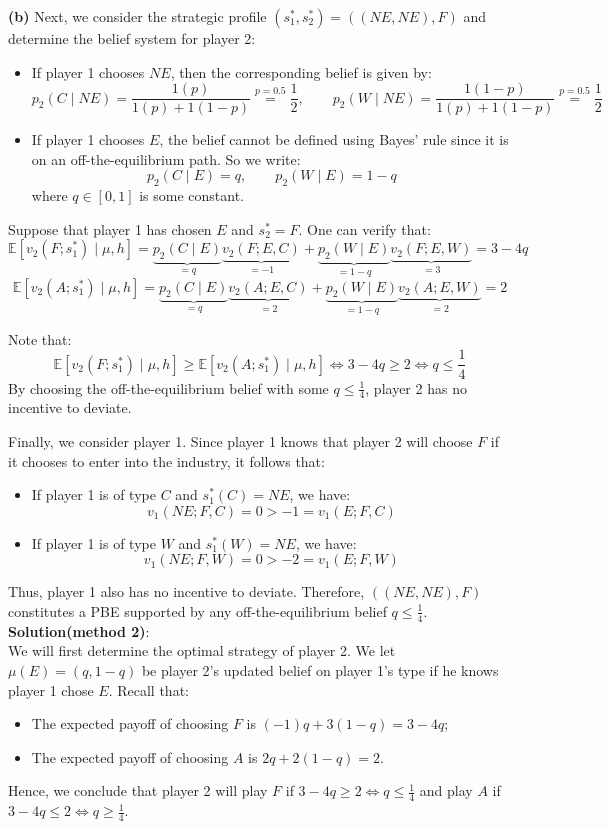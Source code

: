 \documentclass[twoside]{article}
\theoremstyle{definitionstyle}
\begin{document}
\textbf{(b)} Next, we consider the strategic profile $(s_1^*, s_2^*) = ((NE, NE), F)$ and determine the belief system for player 2:
\begin{itemize}
    \item If player 1 chooses $NE$, then the corresponding belief is given by:
    $$p_2(C \mid NE) = \frac{1(p)}{1(p) + 1(1 - p)} \overset{p=0.5}{=} \frac{1}{2}, \qquad p_2(W \mid NE) = \frac{1(1 - p)}{1(p) + 1(1 - p)} \overset{p=0.5}{=} \frac{1}{2}$$
    
    \item If player 1 chooses $E$, the belief cannot be defined using Bayes' rule since it is on an off-the-equilibrium path. So we write:
    $$p_2(C \mid E) = q, \qquad p_2(W \mid E) = 1 - q$$
    where $q \in [0,1]$ is some constant.
\end{itemize}

Suppose that player 1 has chosen $E$ and $s_2^* = F$. One can verify that:
$$\mathbb{E}[v_2(F; s_1^*) \mid \mu, h] = \underbrace{p_2(C \mid E)}_{=q} \underbrace{v_2(F; E, C)}_{=-1} + \underbrace{p_2(W \mid E)}_{=1-q} \underbrace{v_2(F; E, W)}_{=3} = 3 - 4q$$
$$\mathbb{E}[v_2(A; s_1^*) \mid \mu, h] = \underbrace{p_2(C \mid E)}_{=q} \underbrace{v_2(A; E, C)}_{=2} + \underbrace{p_2(W \mid E)}_{=1-q} \underbrace{v_2(A; E, W)}_{=2} = 2$$

Note that:
$$\mathbb{E}[v_2(F; s_1^*) \mid \mu, h] \ge \mathbb{E}[v_2(A; s_1^*) \mid \mu, h] \iff 3 - 4q \ge 2 \iff q \le \frac{1}{4}$$
By choosing the off-the-equilibrium belief with some $q \le \frac{1}{4}$, player 2 has no incentive to deviate.

Finally, we consider player 1. Since player 1 knows that player 2 will choose $F$ if it chooses to enter into the industry, it follows that:
\begin{itemize}
    \item If player 1 is of type $C$ and $s_1^*(C) = NE$, we have:
    $$v_1(NE; F, C) = 0 > -1 = v_1(E; F, C)$$
    \item If player 1 is of type $W$ and $s_1^*(W) = NE$, we have:
    $$v_1(NE; F, W) = 0 > -2 = v_1(E; F, W)$$
\end{itemize}
Thus, player 1 also has no incentive to deviate. Therefore, $((NE, NE), F)$ constitutes a PBE supported by any off-the-equilibrium belief $q \le \frac{1}{4}$.\\
\newline
\textbf{Solution(method 2)}:\\
We will first determine the optimal strategy of player 2. 
We let $\mu(E) = (q, 1 - q)$ be player 2’s updated belief on player 1’s type if he knows player 1 chose $E$. Recall that:
\begin{itemize}
    \item The expected payoff of choosing $F$ is $(-1)q + 3(1 - q) = 3 - 4q$;
    \item The expected payoff of choosing $A$ is $2q + 2(1 - q) = 2$.
\end{itemize}
Hence, we conclude that player 2 will play $F$ if $3 - 4q \ge 2 \iff q \le \frac{1}{4}$ and play $A$ if $3 - 4q \le 2 \iff q \ge \frac{1}{4}$.
\end{document}
